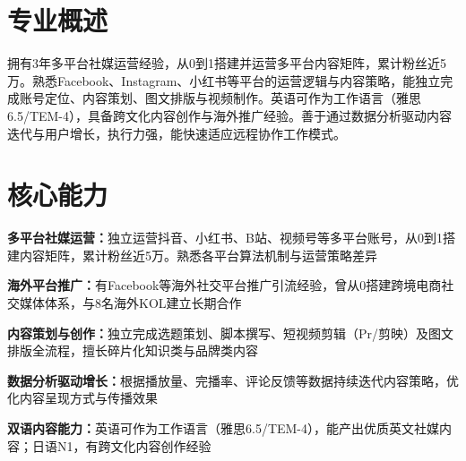 \documentclass[11pt,a4paper,sans]{moderncv}
\begin{document}
\makecvtitle


\section{专业概述}
\vspace{-2pt}

拥有3年多平台社媒运营经验，从0到1搭建并运营多平台内容矩阵，累计粉丝近5万。熟悉Facebook、Instagram、小红书等平台的运营逻辑与内容策略，能独立完成账号定位、内容策划、图文排版与视频制作。英语可作为工作语言（雅思6.5/TEM-4），具备跨文化内容创作与海外推广经验。善于通过数据分析驱动内容迭代与用户增长，执行力强，能快速适应远程协作工作模式。


\section{核心能力}
\vspace{1pt}

\textbf{多平台社媒运营：}独立运营抖音、小红书、B站、视频号等多平台账号，从0到1搭建内容矩阵，累计粉丝近5万。熟悉各平台算法机制与运营策略差异

\vspace{3pt}
\textbf{海外平台推广：}有Facebook等海外社交平台推广引流经验，曾从0搭建跨境电商社交媒体体系，与8名海外KOL建立长期合作

\vspace{3pt}
\textbf{内容策划与创作：}独立完成选题策划、脚本撰写、短视频剪辑（Pr/剪映）及图文排版全流程，擅长碎片化知识类与品牌类内容

\vspace{3pt}
\textbf{数据分析驱动增长：}根据播放量、完播率、评论反馈等数据持续迭代内容策略，优化内容呈现方式与传播效果

\vspace{3pt}
\textbf{双语内容能力：}英语可作为工作语言（雅思6.5/TEM-4），能产出优质英文社媒内容；日语N1，有跨文化内容创作经验

\end{document}
